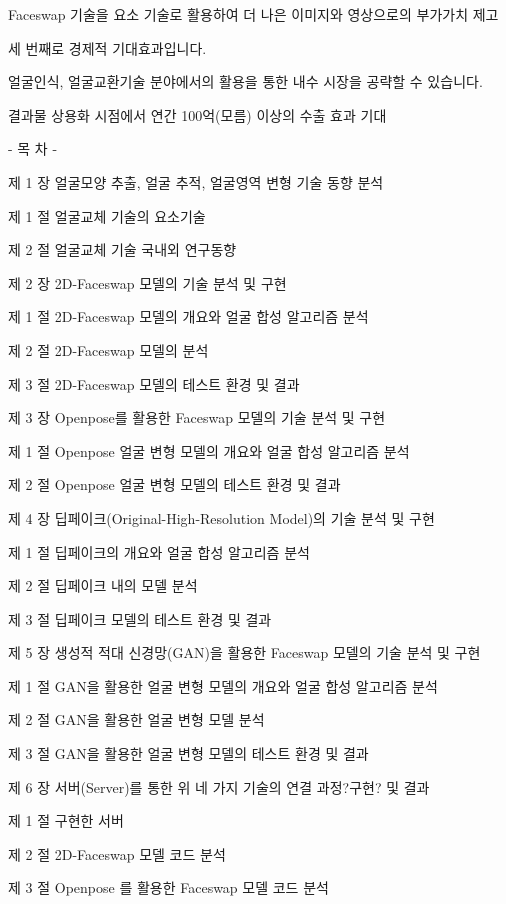 \documentclass{oblivoir}
\begin{document}
Faceswap 기술을 요소 기술로 활용하여 더 나은 이미지와 영상으로의 부가가치 제고

세 번째로 경제적 기대효과입니다.

얼굴인식, 얼굴교환기술 분야에서의 활용을 통한 내수 시장을 공략할 수 있습니다.

결과물 상용화 시점에서 연간 100억(모름) 이상의 수출 효과 기대 

-   목     차   -

제  1  장 얼굴모양 추출, 얼굴 추적, 얼굴영역 변형 기술 동향 분석

       제  1  절 얼굴교체 기술의 요소기술

       제  2  절 얼굴교체 기술 국내외 연구동향

제  2  장 2D-Faceswap 모델의 기술 분석 및 구현

       제  1  절 2D-Faceswap 모델의 개요와 얼굴 합성 알고리즘 분석

       제  2  절 2D-Faceswap 모델의 분석

       제  3  절 2D-Faceswap 모델의 테스트 환경 및 결과

제  3  장 Openpose를 활용한 Faceswap 모델의 기술 분석 및 구현

       제  1  절 Openpose 얼굴 변형 모델의 개요와 얼굴 합성 알고리즘 분석

       제  2  절 Openpose 얼굴 변형 모델의 테스트 환경 및 결과

제  4  장 딥페이크(Original-High-Resolution Model)의 기술 분석 및 구현

       제  1  절 딥페이크의 개요와 얼굴 합성 알고리즘 분석

       제  2  절 딥페이크 내의 모델 분석

       제  3  절 딥페이크 모델의 테스트 환경 및 결과

제  5  장 생성적 적대 신경망(GAN)을 활용한 Faceswap 모델의 기술 분석 및 구현

       제  1  절 GAN을 활용한 얼굴 변형 모델의 개요와 얼굴 합성 알고리즘 분석

       제  2  절 GAN을 활용한 얼굴 변형 모델 분석

       제  3  절 GAN을 활용한 얼굴 변형 모델의 테스트 환경 및 결과

제  6  장 서버(Server)를 통한 위 네 가지 기술의  연결 과정?구현? 및 결과  

  제  1  절 구현한 서버 

  제  2  절 2D-Faceswap 모델 코드 분석

  제  3  절 Openpose 를 활용한 Faceswap 모델 코드 분석
\end{document}

